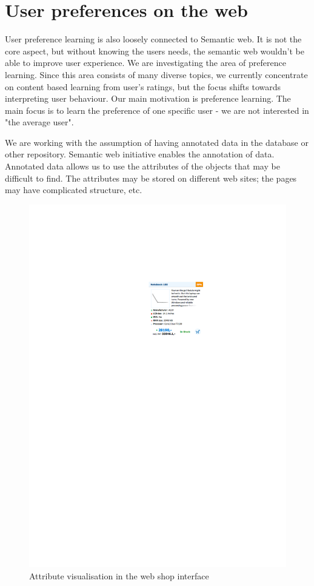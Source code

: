 \documentclass[runningheads,a4paper]{llncs}
\begin{document}
\section{User preferences on the web}
User preference learning is also loosely connected to Semantic web. It is not the core aspect, but without knowing the users needs, the semantic web wouldn't be able to improve user experience. We are investigating the area of preference learning. Since this area consists of many diverse topics, we currently concentrate on content based learning from user's ratings, but the focus shifts towards interpreting user behaviour. Our main motivation is preference learning. The main focus is to learn the preference of one specific user - we are not interested in "the average user".

 
We are working with the assumption of having annotated data in the database or other repository. Semantic web initiative enables the annotation of data. Annotated data allows us to use the attributes of the objects that may be difficult to find. The attributes may be stored on different web sites; the pages may have complicated structure, etc. 

\begin{figure}
	\centering
		\includegraphics{imgVaclav}
	\caption{Attribute visualisation in the web shop interface}
	\label{img:Vaclav}
\end{figure}
\end{document}

